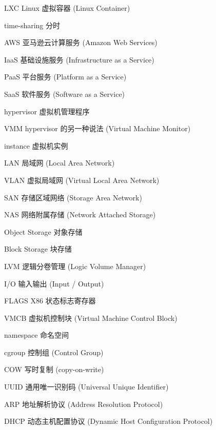\begin{denotation}[3cm]
\item[LXC] Linux 虚拟容器 (Linux Container)
\item[time-sharing] 分时
\item[AWS] 亚马逊云计算服务 (Amazon Web Services)
\item[IaaS] 基础设施服务 (Infrastructure as a Service)
\item[PaaS] 平台服务 (Platform as a Service)
\item[SaaS] 软件服务 (Software as a Service)
\item[hypervisor] 虚拟机管理程序
\item[VMM] hypervisor 的另一种说法 (Virtual Machine Monitor)
\item[instance] 虚拟机实例
\item[LAN] 局域网 (Local Area Network)
\item[VLAN] 虚拟局域网 (Virtual Local Area Network)
\item[SAN] 存储区域网络 (Storage Area Network)
\item[NAS] 网络附属存储 (Network Attached Storage)
\item[Object Storage] 对象存储
\item[Block Storage] 块存储
\item[LVM] 逻辑分卷管理 (Logic Volume Manager)
\item[I/O] 输入输出 (Input / Output)
\item[FLAGS] X86 状态标志寄存器
\item[VMCB] 虚拟机控制块 (Virtual Machine Control Block)
\item[namespace] 命名空间
\item[cgroup] 控制组 (Control Group)
\item[COW] 写时复制 (copy-on-write)
\item[UUID] 通用唯一识别码 (Universal Unique Identifier)
\item[ARP] 地址解析协议 (Address Resolution Protocol)
\item[DHCP] 动态主机配置协议 (Dynamic Host Configuration Protocol)
\end{denotation}

